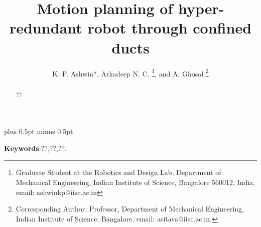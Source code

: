 \documentclass[12pt,a4]{article}
\begin{document}
%
\title{Motion planning of hyper-redundant robot through confined ducts}
%
%
\author{K. P. Ashwin*, Arkadeep N. C.
\thanks{Graduate Student at the Robotics and Design Lab, Department
of Mechanical Engineering, Indian Institute of Science, Bangalore 560012, India, email: ashwinkp@iisc.ac.in}, 
 and A. Ghosal
\thanks{Corresponding Author, Professor, Department of Mechanical Engineering, Indian Institute of Science, Bangalore, email: asitava@iisc.ac.in.}}
%
\baselineskip 18pt plus 0.5pt minus 0.5pt
%
\date{}
\maketitle
\begin{abstract}
\label{sec:abstract}
??
\end{abstract}

\textbf{Keywords}:??,??,??.
\end{document}
